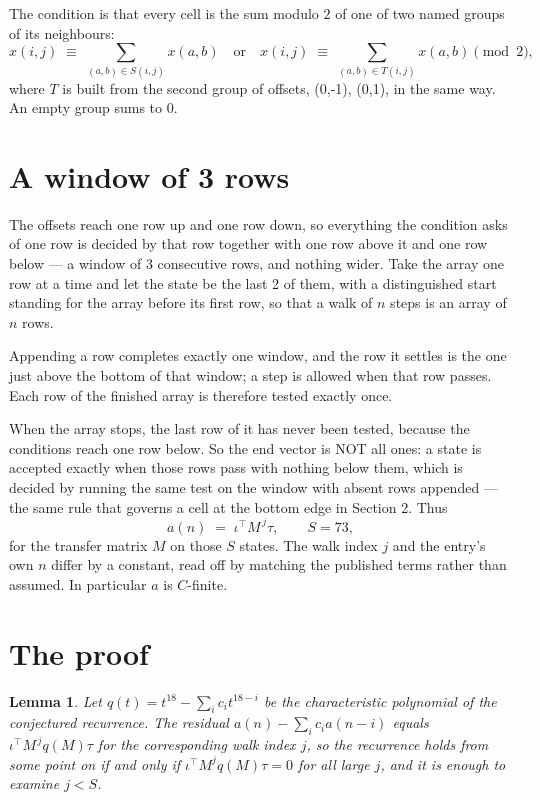 \documentclass[11pt,a4paper]{article}
\theoremstyle{plain}
\newtheorem{lemma}[theorem]{Lemma}
\theoremstyle{definition}
\begin{document}
The condition is that every cell is the sum modulo $2$ of one of two named groups of its neighbours:
\[
x(i,j)\;\equiv\;\sum_{(a,b)\in S(i,j)}x(a,b) \quad\text{or}\quad x(i,j)\;\equiv\;\sum_{(a,b)\in T(i,j)}x(a,b) \pmod{2},
\]
where $T$ is built from the second group of offsets, (0,-1), (0,1), in the same way. An empty group sums to $0$.

\section{A window of 3 rows}

The offsets reach one row up and one row down, so everything the condition asks of one row is
decided by that row together with one row above it and one row below --- a window of
$3$ consecutive rows, and nothing wider. Take the array one row at a time
and let the state be the last 2 of them, with a distinguished start standing for the
array before its first row, so that a walk of $n$ steps is an array of $n$ rows.

Appending a row completes exactly one window, and the row it settles is the one just above the bottom of that window; a step is
allowed when that row passes. Each row of the finished
array is therefore tested exactly once.

When the array stops, the last row of it has never been tested, because the
conditions reach one row below. So the end vector is NOT all ones: a state is accepted exactly when
those rows pass with nothing below them, which is decided by running the same test on the window
with absent rows appended --- the same rule that governs a cell at the bottom edge in
Section 2.
Thus
\[
a(n)\;=\;\iota^{\!\top}M^{\,j}\tau ,\qquad S=73,
\]
for the transfer matrix $M$ on those $S$ states. The walk index $j$ and the entry's own $n$
differ by a constant, read off by matching the published terms rather than assumed. In
particular $a$ is $C$-finite.

\section{The proof}

\begin{lemma}\label{lem:crit}
Let $q(t)=t^{18}-\sum_i c_it^{18-i}$ be the characteristic polynomial of the
conjectured recurrence. The residual $a(n)-\sum_ic_ia(n-i)$ equals
$\iota^{\!\top}M^{\,j}q(M)\tau$ for the corresponding walk index $j$, so the recurrence
holds from some point on if and only if $\iota^{\!\top}M^{j}q(M)\tau=0$ for all large $j$,
and it is enough to examine $j<S$.
\end{lemma}
\end{document}
